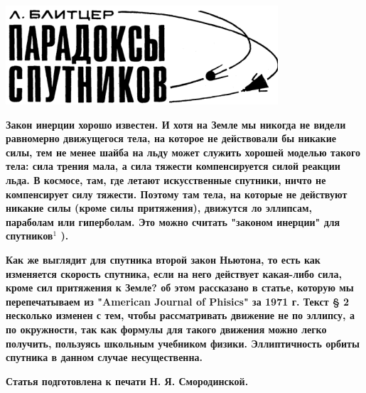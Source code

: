 \begin{flushleft}

\includegraphics[width=\linewidth]{img/satellite.png}
\end{flushleft}

\vspace{15pt}


\leftskip=2cm \rightskip=1cm
\fontsize{12}{13}\selectfont
\begin{minipage}{14cm}
	\textbf{    Закон инерции хорошо известен. И хотя на Земле мы никогда не видели равномерно движущегося тела, на которое не действовали бы никакие силы, тем не менее шайба на льду может служить хорошей моделью такого тела: сила трения мала, а сила тяжести компенсируется силой реакции льда. В космосе, там, где летают искусственные спутники, ничто не компенсирует силу тяжести. Поэтому там тела, на которые не действуют никакие силы (кроме силы притяжения), движутся ло эллипсам, параболам или гиперболам. Это можно считать "законом инерции" для спутников$^1$  ).}
 
 \textbf{ \hspace{10mm} Как же выглядит для спутника второй закон Ньютона, то есть как изменяется скорость спутника, если на него действует какая-либо сила, кроме сил притяжения к Земле? об этом рассказано в статье, которую мы перепечатываем из "American Journal of Phisics" за 1971 г. Текст § 2 несколько изменен с тем, чтобы рассматривать движение не по эллипсу, а по окружности, так как формулы для такого движения можно легко получить, пользуясь школьным учебником физики. Эллиптичность орбиты спутника в данном случае несущественна.}
 
 \textbf{ \hspace{10mm}Статья подготовлена к печати Н. Я. Смородинской.}
\vspace{1cm}
\end{minipage}


